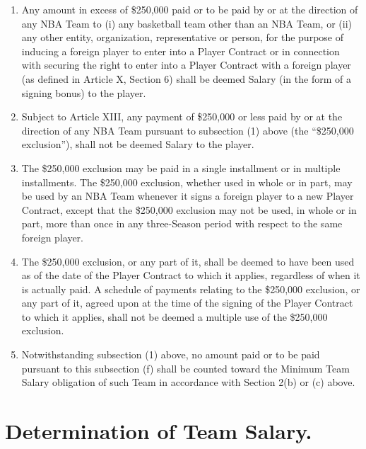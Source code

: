 \documentclass[
]{book}
\providecommand{\tightlist}{%
  \setlength{\itemsep}{0pt}\setlength{\parskip}{0pt}}
\begin{document}
\begin{enumerate}
  \begin{enumerate}
  \def\labelenumii{(\arabic{enumii})}
  \tightlist
  \item
    Any amount in excess of \$250,000 paid or to be paid by or at the direction of any NBA Team to (i) any basketball team other than an NBA Team, or (ii) any other entity, organization, representative or person, for the purpose of inducing a foreign player to enter into a Player Contract or in connection with securing the right to enter into a Player Contract with a foreign player (as defined in Article X, Section 6) shall be deemed Salary (in the form of a signing bonus) to the player.\\
  \item
    Subject to Article XIII, any payment of \$250,000 or less paid by or at the direction of any NBA Team pursuant to subsection (1) above (the ``\$250,000 exclusion''), shall not be deemed Salary to the player.
  \item
    The \$250,000 exclusion may be paid in a single installment or in multiple installments. The \$250,000 exclusion, whether used in whole or in part, may be used by an NBA Team whenever it signs a foreign player to a new Player Contract, except that the \$250,000 exclusion may not be used, in whole or in part, more than once in any three-Season period with respect to the same foreign player.
  \item
    The \$250,000 exclusion, or any part of it, shall be deemed to have been used as of the date of the Player Contract to which it applies, regardless of when it is actually paid. A schedule of payments relating to the \$250,000 exclusion, or any part of it, agreed upon at the time of the signing of the Player Contract to which it applies, shall not be deemed a multiple use of the \$250,000 exclusion.
  \item
    Notwithstanding subsection (1) above, no amount paid or to be paid pursuant to this subsection (f) shall be counted toward the Minimum Team Salary obligation of such Team in accordance with Section 2(b) or (c) above.
  \end{enumerate}
\end{enumerate}

\hypertarget{determination-of-team-salary.}{%
\section{Determination of Team Salary.}\label{determination-of-team-salary.}}
\end{document}
